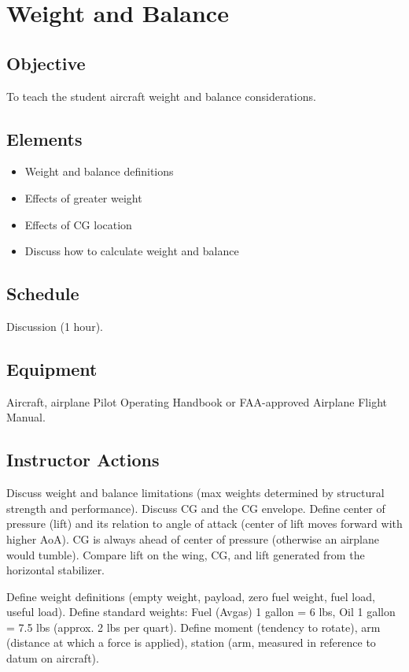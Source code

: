\chapter{Weight and Balance}

\section{Objective}

To teach the student aircraft weight and balance considerations.

\section{Elements}

\begin{itemize}
  \item Weight and balance definitions
  \item Effects of greater weight
  \item Effects of CG location
  \item Discuss how to calculate weight and balance
\end{itemize}

\section{Schedule}

Discussion (1 hour).

\section{Equipment}

Aircraft, airplane Pilot Operating Handbook or FAA-approved Airplane Flight
Manual.

\section{Instructor Actions}

Discuss weight and balance limitations (max weights determined by structural
strength and performance). Discuss CG and the CG envelope. Define center of
pressure (lift) and its relation to angle of attack (center of lift moves
forward with higher AoA). CG is always ahead of center of pressure (otherwise
an airplane would tumble). Compare lift on the wing, CG, and lift generated
from the horizontal stabilizer.

Define weight definitions (empty weight, payload, zero fuel weight, fuel load,
useful load). Define standard weights: Fuel (Avgas) 1 gallon = 6 lbs, Oil 1
gallon = 7.5 lbs (approx. 2 lbs per quart). Define moment (tendency to rotate),
arm (distance at which a force is applied), station (arm, measured in reference
to datum on aircraft).

